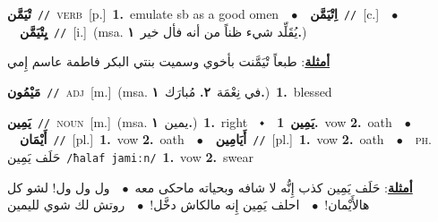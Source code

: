 \documentclass[10pt,a4paper,twoside]{article} %
\begin{document}
\begin{multicols}{2}
{\setlength\topsep{0pt}\textbf{\foreignlanguage{arabic}{تْيَمَّن}}\ {\color{gray}\texttt{//}\color{black}}\ \textsc{verb}\ [p.]\ \textbf{1.}~emulate sb as a good omen\ \ $\bullet$\ \ \setlength\topsep{0pt}\textbf{\foreignlanguage{arabic}{اِتْيَمَّن}}\ {\color{gray}\texttt{//}\color{black}}\ [c.]\ \ $\bullet$\ \ \setlength\topsep{0pt}\textbf{\foreignlanguage{arabic}{يِتْيَمَّن}}\ {\color{gray}\texttt{//}\color{black}}\ [i.]\ \color{gray}(msa. \foreignlanguage{arabic}{يُقَلِّد شيء ظناً من أنه فأل خير}~\foreignlanguage{arabic}{\textbf{١.}})\color{black}\  \begin{flushright}\color{gray}\foreignlanguage{arabic}{\textbf{\underline{\foreignlanguage{arabic}{أمثلة}}}: طبعاً تْيَمَّنت بأخوي وسميت بنتي البكر فاطمة عاسم إِمي}\end{flushright}\color{black}} \vspace{2mm}

{\setlength\topsep{0pt}\textbf{\foreignlanguage{arabic}{مَيْمُون}}\ {\color{gray}\texttt{//}\color{black}}\ \textsc{adj}\ [m.]\ \color{gray}(msa. \foreignlanguage{arabic}{في نِعْمَة}~\foreignlanguage{arabic}{\textbf{٢.}}  \foreignlanguage{arabic}{مُبارَك}~\foreignlanguage{arabic}{\textbf{١.}})\color{black}\ \textbf{1.}~blessed\ } \vspace{2mm}

{\setlength\topsep{0pt}\textbf{\foreignlanguage{arabic}{يَمِين}}\ {\color{gray}\texttt{//}\color{black}}\ \textsc{noun}\ [m.]\ \color{gray}(msa. \foreignlanguage{arabic}{يمين}~\foreignlanguage{arabic}{\textbf{١.}})\color{black}\ \textbf{1.}~right\ \ $\smblkdiamond$\ \ \setlength\topsep{0pt}\textbf{\foreignlanguage{arabic}{يَمِين}}\ \textbf{1.}~vow  \textbf{2.}~oath\ \ $\bullet$\ \ \setlength\topsep{0pt}\textbf{\foreignlanguage{arabic}{أَيْمَان}}\ {\color{gray}\texttt{//}\color{black}}\ [pl.]\ \textbf{1.}~vow  \textbf{2.}~oath\ \ $\bullet$\ \ \setlength\topsep{0pt}\textbf{\foreignlanguage{arabic}{أَيَامِين}}\ {\color{gray}\texttt{//}\color{black}}\ [pl.]\ \textbf{1.}~vow  \textbf{2.}~oath\ \ $\bullet$\ \ \textsc{ph.} \color{gray} \foreignlanguage{arabic}{حَلَف يَمِين}\color{black}\ {\color{gray}\texttt{/{\sffamily ħalaf jamiːn}/}\color{black}}\ \textbf{1.}~vow  \textbf{2.}~swear\  \begin{flushright}\color{gray}\foreignlanguage{arabic}{\textbf{\underline{\foreignlanguage{arabic}{أمثلة}}}: حَلَف يَمِين كذب إِنُّه لا شافه وبحياته ماحكى معه\ $\bullet$\ \  ول ول ول! لشو كل هالأَيْمان!\ $\bullet$\ \  احلف يَمِين إِنه مالكاش دخَّل!\ $\bullet$\ \  روتش لك شوي لليمين}\end{flushright}\color{black}} \vspace{2mm}


\end{multicols}
\end{document}
